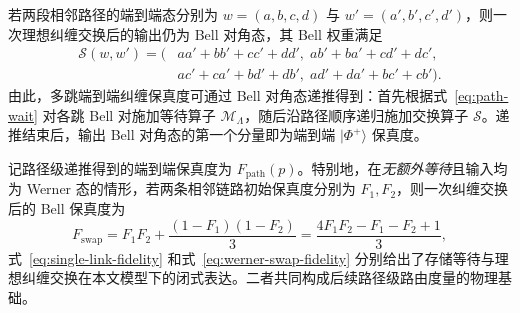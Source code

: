 若两段相邻路径的端到端态分别为 $w=(a,b,c,d)$ 与 $w'=(a',b',c',d')$，则一次理想纠缠交换后的输出仍为 Bell 对角态，其 Bell 权重满足
\begin{equation}
  \begin{aligned}
  \mathcal{S}(w, w')
  =
  \bigl(&
    aa' + bb' + cc' + dd',\;
    ab' + ba' + cd' + dc', \\
  &
    ac' + ca' + bd' + db',\;
    ad' + da' + bc' + cb'
  \bigr).
  \end{aligned}
  \label{eq:bell-swap-operator}
\end{equation}
由此，多跳端到端纠缠保真度可通过 Bell 对角态递推得到：首先根据式~\eqref{eq:path-wait} 对各跳 Bell 对施加等待算子 $\mathcal{M}_{\Lambda}$，随后沿路径顺序递归施加交换算子 $\mathcal{S}$。递推结束后，输出 Bell 对角态的第一个分量即为端到端 $\vert\Phi^+\rangle$ 保真度。

记路径级递推得到的端到端保真度为 $F_{\mathrm{path}}(p)$。特别地，在\emph{无额外等待}且输入均为 Werner 态的情形，若两条相邻链路初始保真度分别为 $F_1,F_2$，则一次纠缠交换后的 Bell 保真度为
\begin{equation}
  F_{\mathrm{swap}}
  = F_1 F_2 + \frac{(1 - F_1)(1 - F_2)}{3}
  = \frac{4F_1F_2 - F_1 - F_2 + 1}{3},
  \label{eq:werner-swap-fidelity}
\end{equation}
式~\eqref{eq:single-link-fidelity} 和式~\eqref{eq:werner-swap-fidelity} 分别给出了存储等待与理想纠缠交换在本文模型下的闭式表达。二者共同构成后续路径级路由度量的物理基础。

